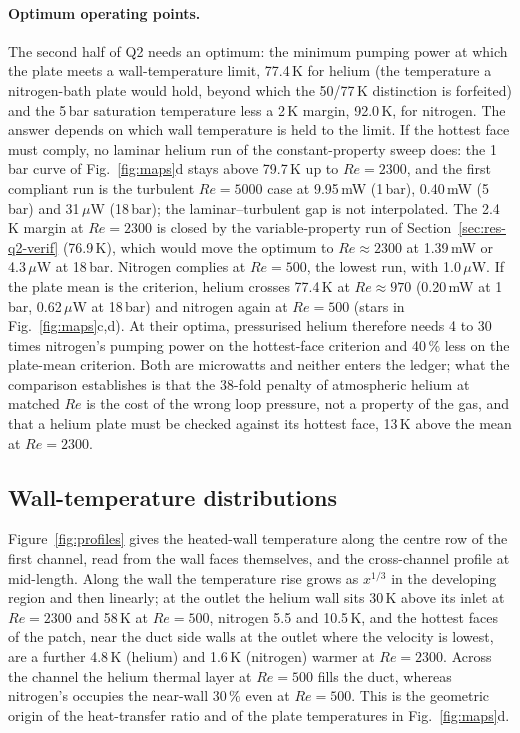 \documentclass[preprint,12pt]{elsarticle}
\renewcommand{\Re}{\mathit{Re}}
\begin{document}
\paragraph{Optimum operating points.} The second half of Q2 needs an optimum: the minimum
pumping power at which the plate meets a wall-temperature limit, 77.4\,K for helium (the
temperature a nitrogen-bath plate would hold, beyond which the 50/77\,K distinction is
forfeited) and the 5\,bar saturation temperature less a 2\,K margin, 92.0\,K, for nitrogen.
The answer depends on which wall temperature is held to the limit. If the hottest face must
comply, no laminar helium run of the constant-property sweep does: the 1\,bar curve of
Fig.~\ref{fig:maps}d stays above 79.7\,K up to $\Re=2300$, and the first compliant run is the
turbulent $\Re=5000$ case at 9.95\,mW (1\,bar), 0.40\,mW (5\,bar) and 31\,$\mu$W (18\,bar);
the laminar--turbulent gap is not interpolated. The 2.4\,K margin at $\Re=2300$ is closed by
the variable-property run of Section~\ref{sec:res-q2-verif} (76.9\,K), which would move the
optimum to $\Re\approx2300$ at 1.39\,mW or 4.3\,$\mu$W at 18\,bar. Nitrogen complies at
$\Re=500$, the lowest run, with 1.0\,$\mu$W. If the plate mean is the criterion, helium
crosses 77.4\,K at $\Re\approx970$ (0.20\,mW at 1\,bar, 0.62\,$\mu$W at 18\,bar) and nitrogen
again at $\Re=500$ (stars in Fig.~\ref{fig:maps}c,d). At their optima, pressurised helium
therefore needs 4 to 30 times nitrogen's pumping power on the hottest-face criterion and
40\,\% less on the plate-mean criterion. Both are microwatts and neither enters the ledger;
what the comparison establishes is that the 38-fold penalty of atmospheric helium at matched
$\Re$ is the cost of the wrong loop pressure, not a property of the gas, and that a helium
plate must be checked against its hottest face, 13\,K above the mean at $\Re=2300$.

\subsection{Wall-temperature distributions}
\label{sec:res-q2-walls}

Figure~\ref{fig:profiles} gives the heated-wall temperature along the centre row of the first
channel, read from the wall faces themselves, and the cross-channel profile at mid-length.
Along the wall the temperature rise grows as $x^{1/3}$ in the developing region and then
linearly; at the outlet the helium wall sits 30\,K above its inlet at $\Re=2300$ and 58\,K at
$\Re=500$, nitrogen 5.5 and 10.5\,K, and the hottest faces of the patch, near the duct side
walls at the outlet where the velocity is lowest, are a further 4.8\,K (helium) and 1.6\,K
(nitrogen) warmer at $\Re=2300$. Across the channel the helium thermal layer at
$\Re=500$ fills the duct, whereas nitrogen's occupies the near-wall 30\,\% even at $\Re=500$.
This is the geometric origin of the heat-transfer ratio and of the plate temperatures in
Fig.~\ref{fig:maps}d.
\end{document}
